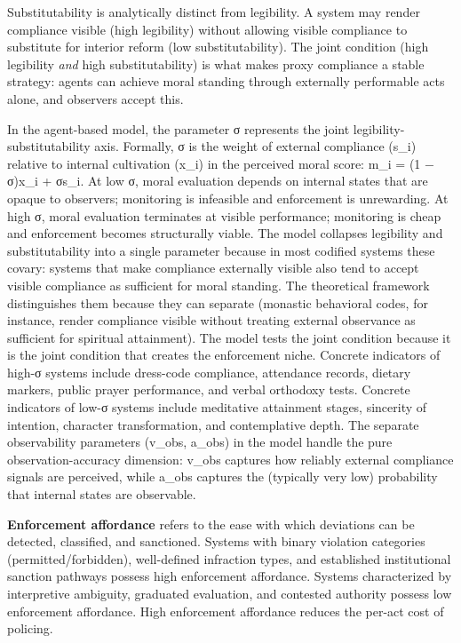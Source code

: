 \documentclass[12pt]{article}
\begin{document}
Substitutability is analytically distinct from legibility. A system may render compliance visible (high legibility) without allowing visible compliance to substitute for interior reform (low substitutability). The joint condition (high legibility \emph{and} high substitutability) is what makes proxy compliance a stable strategy: agents can achieve moral standing through externally performable acts alone, and observers accept this.

In the agent-based model, the parameter σ represents the joint legibility-substitutability axis. Formally, σ is the weight of external compliance (s\_i) relative to internal cultivation (x\_i) in the perceived moral score: m\_i = (1 − σ)x\_i + σs\_i. At low σ, moral evaluation depends on internal states that are opaque to observers; monitoring is infeasible and enforcement is unrewarding. At high σ, moral evaluation terminates at visible performance; monitoring is cheap and enforcement becomes structurally viable. The model collapses legibility and substitutability into a single parameter because in most codified systems these covary: systems that make compliance externally visible also tend to accept visible compliance as sufficient for moral standing. The theoretical framework distinguishes them because they can separate (monastic behavioral codes, for instance, render compliance visible without treating external observance as sufficient for spiritual attainment). The model tests the joint condition because it is the joint condition that creates the enforcement niche. Concrete indicators of high-σ systems include dress-code compliance, attendance records, dietary markers, public prayer performance, and verbal orthodoxy tests. Concrete indicators of low-σ systems include meditative attainment stages, sincerity of intention, character transformation, and contemplative depth. The separate observability parameters (v\_obs, a\_obs) in the model handle the pure observation-accuracy dimension: v\_obs captures how reliably external compliance signals are perceived, while a\_obs captures the (typically very low) probability that internal states are observable.

\textbf{Enforcement affordance} refers to the ease with which deviations can be detected, classified, and sanctioned. Systems with binary violation categories (permitted/forbidden), well-defined infraction types, and established institutional sanction pathways possess high enforcement affordance. Systems characterized by interpretive ambiguity, graduated evaluation, and contested authority possess low enforcement affordance. High enforcement affordance reduces the per-act cost of policing.
\end{document}
